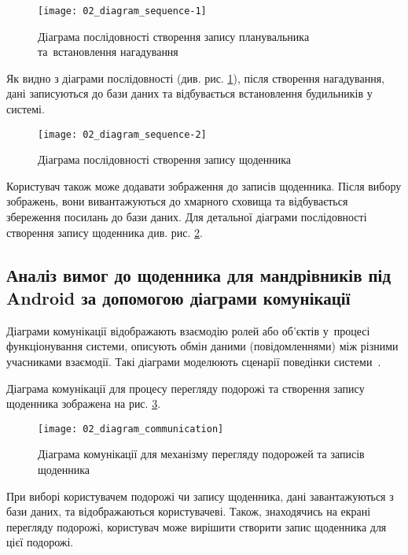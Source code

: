 \documentclass[../main.tex]{subfiles}
\begin{document}

\begin{figure}[H]
	\centering
	\texttt{[image: 02\_diagram\_sequence-1]}
	\caption{Діаграма послідовності створення запису планувальника та~встановлення нагадування} %
	\label{diagram:sequence_reminder}
\end{figure}

Як видно з діаграми послідовності (див. рис. \ref{diagram:sequence_reminder}), після створення нагадування, дані записуються до бази даних та відбувається встановлення будильників у системі. 

\begin{figure}[H]
	\centering
	\texttt{[image: 02\_diagram\_sequence-2]}
	\caption{Діаграма послідовності створення запису щоденника} %
	\label{diagram:sequence_diary}
\end{figure}

Користувач також може додавати зображення до записів щоденника. Після вибору зображень, вони вивантажуються до хмарного сховища та відбувається збереження посилань до бази даних. Для детальної діаграми послідовності створення запису щоденника див. рис. \ref{diagram:sequence_diary}.

\subsection{Аналіз вимог до щоденника для мандрівників під Android за допомогою діаграми комунікації}
Діаграми комунікації відображають взаємодію ролей або об'єктів у~процесі функціонування системи, описують обмін даними (повідомленнями) між різними учасниками взаємодії. Такі діаграми моделюють сценарії поведінки системи~\cite{diploma_guidelines}. 

Діаграма комунікації для процесу перегляду подорожі та створення запису щоденника зображена на рис. \ref{diagram:communication}.

\begin{figure}[H]
	\centering
	\texttt{[image: 02\_diagram\_communication]}
	\caption{Діаграма комунікації для механізму перегляду подорожей та записів щоденника}
	\label{diagram:communication}
\end{figure}

При виборі користувачем подорожі чи запису щоденника, дані завантажуються з бази даних, та відображаються користувачеві. Також, знаходячись на екрані перегляду подорожі, користувач може вирішити створити запис щоденника для цієї подорожі.
\end{document}
